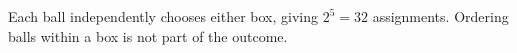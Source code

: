 Each ball independently chooses either box, giving $2^5=\boxed{32}$ assignments. Ordering balls within a box is not part of the outcome.
